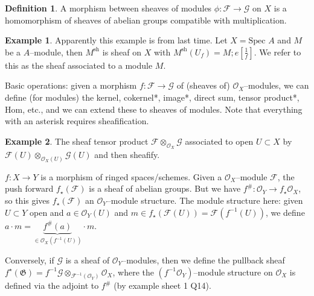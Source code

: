 \documentclass{article}
\theoremstyle{definition}
\newtheorem{example}{Example}[section]
\newtheorem{defn}{Definition}[section]
\begin{document}
\begin{defn}
    A morphism between sheaves of modules $\phi : \mathcal{F} \to \mathcal{G}$ on $X$ is a homomorphism of sheaves of abelian groups compatible with multiplication.
\end{defn}
\begin{example}
    Apparently this example is from last time. Let $X = \text{Spec }A$ and $M$ be a $A$--module, then $M^{\text{sh}}$ is sheaf on $X$ with $M^{\text{sh}}(U_f) = M;e[\frac{1}{f}]$. We refer to this as the sheaf associated to a module $M$.
\end{example}

Basic operations: given a morphism $f : \mathcal{F} \to \mathcal{G}$ of (sheaves of) $\mathcal{O}_X$--modules, we can define (for modules) the kernel, cokernel*, image*, direct sum, tensor product*, Hom, etc., and we can extend these to sheaves of modules. Note that everything with an asterisk requires sheafification.
\begin{example}
    The sheaf tensor product $\mathcal{F} \otimes_{\mathcal{O}_X} \mathcal{G}$ associated to open $U \subset X$ by $\mathcal{F}(U) \otimes_{\mathcal{O}_X(U)} \mathcal{G}(U)$ and then sheafify. 
\end{example}
$f : X \to Y$ is a morphism of ringed spaces/schemes. Given a $\mathcal{O}_X$--module $\mathcal{F}$, the push forward $f_{\star}(\mathcal{F})$ is a sheaf of abelian groups. But we have $f^{\#} : \mathcal{O}_Y \to f_{\star}\mathcal{O}_X$, so this gives $f_{\star}(\mathcal{F})$ an $\mathcal{O}_Y$--module structure. The module structure here: given $U \subset Y$ open and $a \in \mathcal{O}_Y(U)$ and $m \in f_{\star}(\mathcal{F}(U)) = \mathcal{F}(f^{-1}(U))$, we define $a\cdot m = \underbrace{f^{\#}(a)}_{\in \mathcal{O}_X(f^{-1}(U))} \cdot m$.
\vspace{1mm}
 
Conversely, if $\mathcal{G}$ is a sheaf of $\mathcal{O}_Y$--modules, then we define the pullback sheaf $f^{\star}(\mathfrak{G}) = f^{-1} \mathcal{G} \otimes_{\mathcal{F}^{-1}(\mathcal{O}_Y)} \mathcal{O}_X$, where the $(f^{-1}\mathcal{O}_Y)$--module structure on $\mathcal{O}_X$ is defined via the adjoint to $f^{\#}$ (by example sheet 1 Q14).
\end{document}
